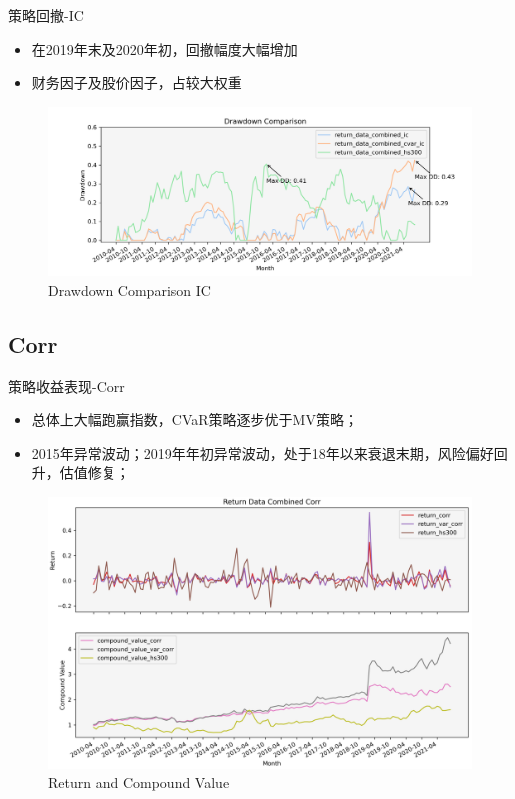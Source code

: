 \documentclass[CJK,aspectratio=43]{beamer}  %
\begin{document}
\begin{frame}{策略回撤-IC}
	\begin{itemize}
		\item 在2019年末及2020年初，回撤幅度大幅增加
		\item 财务因子及股价因子，占较大权重
	\end{itemize}
	\begin{figure}
		\centering
		\includegraphics[width=1\linewidth]{"pic/Drawdown_Comparison_IC"}
		\caption{Drawdown Comparison IC}
		\label{fig:icdramdown}
	\end{figure}
\end{frame}

\subsection{Corr}
\begin{frame}{策略收益表现-Corr}
	\begin{itemize}
	\item 总体上大幅跑赢指数，CVaR策略逐步优于MV策略；
	\item 2015年异常波动；2019年年初异常波动，处于18年以来衰退末期，风险偏好回升，估值修复；
	\end{itemize}
	\begin{figure}
		\centering
		\includegraphics[width=0.79\linewidth]{pic/Corr}
		\caption{Return and Compound Value}
		\label{fig:corr}
	\end{figure}
\end{frame}
\end{document}
